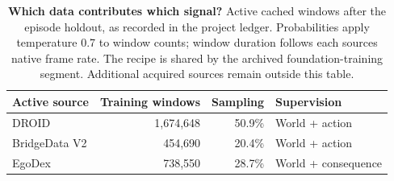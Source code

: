 \begin{table}[t]
\centering\small
\begin{tabular}{lrrl}
\toprule
Active source & Training windows & Sampling & Supervision \\
\midrule
DROID & 1,674,648 & 50.9\% & World + action \\
BridgeData V2 & 454,690 & 20.4\% & World + action \\
EgoDex & 738,550 & 28.7\% & World + consequence \\
\bottomrule
\end{tabular}
\caption{\textbf{Which data contributes which signal?} Active cached windows after the episode holdout, as recorded in the project ledger. Probabilities apply temperature 0.7 to window counts; window duration follows each source\textquotesingle s native frame rate. The recipe is shared by the archived foundation-training segment. Additional acquired sources remain outside this table.}
\label{tab:data}
\end{table}
